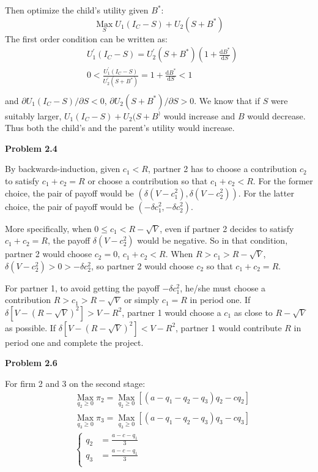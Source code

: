\documentclass{article}
\begin{document}
{{{    Then optimize the child's utility given $B^*$:
    \begin{equation*}
        \mathop{Max} \limits_S U_1(I_C-S)+U_2(S+B^*)
    \end{equation*}
    The first order condition can be written as:
    \begin{align*}
        &U_1^\prime(I_C-S)=U_2^\prime(S+B^*)(1+\frac{\mathrm{d} B^*}{\mathrm{d} S})\\
        &0<\frac{U_1^\prime(I_C-S)}{U_2^\prime(S+B^*)}=1+\frac{\mathrm{d} B^*}{\mathrm{d} S}<1\\
    \end{align*}
    and $\partial U_1(I_C-S)/\partial S<0$, $\partial U_2(S+B^*)/\partial S>0$. We know that if $S$ were suitably larger, $U_1(I_C-S)+U_2(S+B^)$ would increase and $B$ would decrease. Thus both the child's and the parent's utility would increase.

    \noindent\Large{\textbf{{Problem 2.4}}

    By backwards-induction, given $c_1<R$, partner 2 has to choose a contribution $c_2$ to satisfy $c_1+c_2=R$ or choose a contribution so that $c_1+c_2<R$. For the former choice, the pair of payoff would be $(\delta(V-c_1^2),\delta(V-c_2^2))$. For the latter choice, the pair of payoff would be $(-\delta c_1^2,-\delta c_2^2)$.

    More specifically, when $0 \leqslant c_1<R-\sqrt{V}$, even if partner 2 decides to satisfy $c_1+c_2=R$, the payoff $\delta(V-c_2^2)$ would be negative. So in that condition, partner 2 would choose $c_2=0$, $c_1+c_2<R$. When $R>c_1>R-\sqrt{V}$, $\delta(V-c_2^2)>0>-\delta c_2^2$, so partner 2 would choose $c_2$ so that $c_1+c_2=R$.
    
    For partner 1, to avoid getting the payoff $-\delta c_1^2$, he/she must choose a contribution $R>c_1>R-\sqrt{V}$ or simply $c_1=R$ in period one. If $\delta [V-(R-\sqrt{V})^2]>V-R^2$, partner 1 would choose a $c_1$ as close to $R-\sqrt{V}$ as possible. If $\delta [V-(R-\sqrt{V})^2]<V-R^2$, partner 1 would contribute $R$ in period one and complete the project.

    \noindent\Large{\textbf{{Problem 2.6}}

    For firm 2 and 3 on the second stage:
    \begin{align*}
        &\mathop{Max} \limits_{q_2 \geqslant 0} \pi_2=\mathop{Max} \limits_{q_2 \geqslant 0}[(a-q_1-q_2-q_3)q_2-cq_2]\\
        &\mathop{Max} \limits_{q_3 \geqslant 0} \pi_3=\mathop{Max} \limits_{q_3 \geqslant 0}[(a-q_1-q_2-q_3)q_3-cq_3]\\
        &\left\{
            \begin{array}{rl}
            q_2 &= \frac{a-c-q_1}{3}\\
            q_3 &= \frac{a-c-q_1}{3}\\
            \end{array} \right.
    \end{align*}

}}}}}
\end{document}
